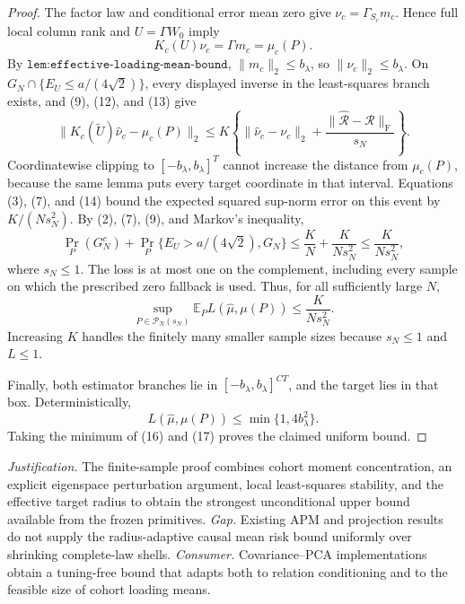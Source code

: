 \documentclass{article}
\begin{document}
\begin{proof}
The factor law and conditional error mean zero give \(\nu_c=\Gamma_{S_c}m_c\). Hence full local column rank and \(U=\Gamma W_0\) imply
\[
K_c(U)\nu_c=\Gamma m_c=\mu_c(P).
\tag{13}
\]
By \(\texttt{lem:effective-loading-mean-bound}\), \(\|m_c\|_2\leq b_\lambda\), so \(\|\nu_c\|_2\leq b_\lambda\). On \(G_N\cap\{E_U\leq a/(4\sqrt2)\}\), every displayed inverse in the least-squares branch exists, and (9), (12), and (13) give
\[
\|K_c(\widetilde U)\widehat\nu_c-\mu_c(P)\|_2
\leq K\left\{\|\widehat\nu_c-\nu_c\|_2
+\frac{\|\widehat{\mathcal R}-\mathcal R\|_{\mathrm F}}{s_N}\right\}.
\tag{14}
\]
Coordinatewise clipping to \([-b_\lambda,b_\lambda]^T\) cannot increase the distance from \(\mu_c(P)\), because the same lemma puts every target coordinate in that interval. Equations (3), (7), and (14) bound the expected squared sup-norm error on this event by \(K/(Ns_N^2)\). By (2), (7), (9), and Markov's inequality,
\[
\Pr_P(G_N^c)+\Pr_P\{E_U>a/(4\sqrt2),G_N\}
\leq\frac K N+\frac{K}{Ns_N^2}
\leq\frac{K}{Ns_N^2},
\tag{15}
\]
where \(s_N\leq1\). The loss is at most one on the complement, including every sample on which the prescribed zero fallback is used. Thus, for all sufficiently large \(N\),
\[
\sup_{P\in\mathcal P_N(s_N)}
\mathbb E_PL(\widehat\mu,\mu(P))
\leq\frac{K}{Ns_N^2}.
\tag{16}
\]
Increasing \(K\) handles the finitely many smaller sample sizes because \(s_N\leq1\) and \(L\leq1\).

Finally, both estimator branches lie in \([-b_\lambda,b_\lambda]^{CT}\), and the target lies in that box. Deterministically,
\[
L(\widehat\mu,\mu(P))\leq\min\{1,4b_\lambda^2\}.
\tag{17}
\]
Taking the minimum of (16) and (17) proves the claimed uniform bound.
\end{proof}
\par\smallskip\noindent \textit{Justification.} The finite-sample proof combines cohort moment concentration, an explicit eigenspace perturbation argument, local least-squares stability, and the effective target radius to obtain the strongest unconditional upper bound available from the frozen primitives. \textit{Gap.} Existing APM and projection results do not supply the radius-adaptive causal mean risk bound uniformly over shrinking complete-law shells. \textit{Consumer.} Covariance--PCA implementations obtain a tuning-free bound that adapts both to relation conditioning and to the feasible size of cohort loading means.
\end{document}
